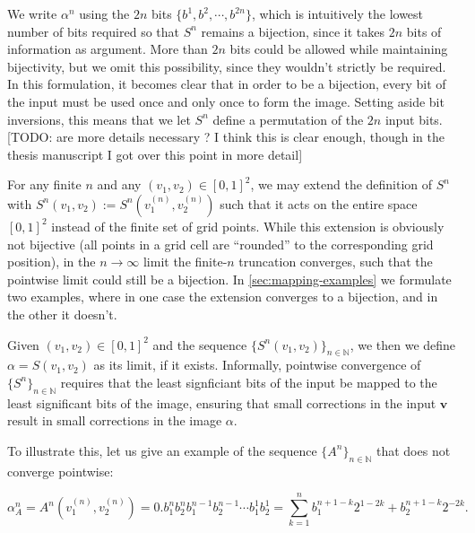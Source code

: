 \documentclass[10pt,letterpaper]{article}
\renewcommand{\vec}[1]{\boldsymbol{#1}}
\begin{document}

We write $\alpha^n$ using the $2n$ bits $\{b^1, b^2, \cdots, b^{2n}\}$, which is intuitively the lowest number of bits required so that $S^n$ remains a bijection, since it takes $2n$ bits of information as argument. More than $2n$ bits could be allowed while maintaining bijectivity, but we omit this possibility, since they wouldn't strictly be required. In this formulation, it becomes clear that in order to be a bijection, every bit of the input must be used once and only once to form the image. Setting aside bit inversions, this means that we let $S^n$ define a permutation of the $2n$ input bits. [TODO: are more details necessary ? I think this is clear enough, though in the thesis manuscript I got over this point in more detail]

For any finite $n$ and any $(v_1,v_2) \in [0,1]^2$, we may extend the definition of $S^n$ with $S^n(v_1, v_2) := S^n(v_1^{(n)}, v_2^{(n)})$ such that it acts on the entire space $[0,1]^2$ instead of the finite set of grid points. While this extension is obviously not bijective (all points in a grid cell are ``rounded'' to the corresponding grid position), in the $n \to \infty$ limit the finite-$n$ truncation converges, such that the pointwise limit could still be a bijection. In \autoref{sec:mapping-examples} we formulate two examples, where in one case the extension converges to a bijection, and in the other it doesn't.

Given $(v_1, v_2) \in [0,1]^2$ and the sequence $\{S^n(v_1, v_2)\}_{n \in \mathbb N}$, we then we define $\alpha = S(v_1, v_2)$ as its limit, if it exists. Informally, pointwise convergence of $\{S^n\}_{n\in\mathbb N}$ requires that the least signficiant bits of the input be mapped to the least significant bits of the image, ensuring that small corrections in the input $\vec{v}$ result in small corrections in the image $\alpha$.

To illustrate this, let us give an example of the sequence $\{A^n\}_{n \in \mathbb N}$ that does not converge pointwise:

\begin{equation*}
\alpha_A^n = A^n(v_1^{(n)},v_2^{(n)}) = 0.b_1^n b_2^n b_1^{n-1} b_2^{n-1} \cdots b_1^1 b_2^1 = \sum_{k=1}^n b_1^{n+1-k} 2^{1-2k} + b_2^{n+1-k} 2^{-2k}.
\end{equation*}
\end{document}
